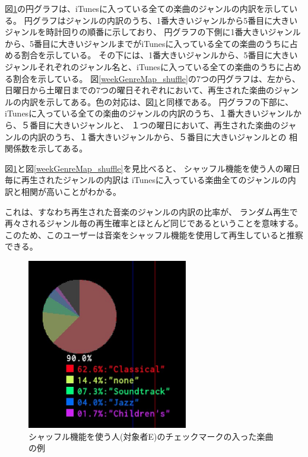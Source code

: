\documentclass[a4paper, 11pt, onecolumn, report]{jsarticle}
\begin{document}
図\ref{checkedItemsGenreMap_shuffle}の円グラフは、iTunesに入っている全ての楽曲のジャンルの内訳を示している。
円グラフはジャンルの内訳のうち、1番大きいジャンルから5番目に大きいジャンルを時計回りの順番に示しており、
円グラフの下側に1番大きいジャンルから、5番目に大きいジャンルまでがiTunesに入っている全ての楽曲のうちに占める割合を示している。
その下には、1番大きいジャンルから、5番目に大きいジャンルそれぞれのジャンル名と、iTunesに入っている全ての楽曲のうちに占める割合を示している。
図\ref{weekGenreMap_shuffle}の7つの円グラフは、左から、日曜日から土曜日までの7つの曜日それぞれにおいて、再生された楽曲のジャンルの内訳を示してある。色の対応は、図\ref{checkedItemsGenreMap_shuffle}と同様である。
円グラフの下部に、
iTunesに入っている全ての楽曲のジャンルの内訳のうち、１番大きいジャンルから、５番目に大きいジャンルと、
１つの曜日において、再生された楽曲のジャンルの内訳のうち、１番大きいジャンルから、５番目に大きいジャンルとの
相関係数を示してある。

図\ref{checkedItemsGenreMap_shuffle}と図\ref{weekGenreMap_shuffle}を見比べると、
シャッフル機能を使う人の曜日毎に再生されたジャンルの内訳は
iTunesに入っている楽曲全てのジャンルの内訳と相関が高いことがわかる。

これは、すなわち再生された音楽のジャンルの内訳の比率が、
ランダム再生で再々されるジャンル毎の再生確率とほとんど同じであるということを意味する。
このため、このユーザーは音楽をシャッフル機能を使用して再生していると推察できる。


\clearpage

\begin{figure}[h]
\begin{center}
\includegraphics[width=7cm]{taru_checkedItemGenreRatio.jpg}
\caption{シャッフル機能を使う人(対象者E)のチェックマークの入った楽曲の例}
\label{checkedItemsGenreMap_shuffle}
\end{center}
\end{figure}
\end{document}
